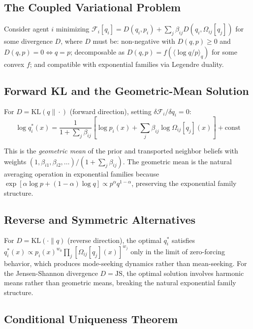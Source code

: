 \documentclass[11pt]{article}
\begin{document}
\subsection*{The Coupled Variational Problem}

Consider agent $i$ minimizing $\mathcal{F}_i[q_i] = D(q_i, p_i) + \sum_j \beta_{ij} D(q_i, \Omega_{ij}[q_j])$ for some divergence $D$, where $D$ must be: non-negative with $D(q, p) \geq 0$ and $D(q, p) = 0 \iff q = p$; decomposable as $D(q, p) = f(\langle \log q/p \rangle_q)$ for some convex $f$; and compatible with exponential families via Legendre duality.

\subsection*{Forward KL and the Geometric-Mean Solution}

For $D = \mathrm{KL}(q \| \cdot)$ (forward direction), setting $\delta \mathcal{F}_i / \delta q_i = 0$:
\begin{equation}
\log q_i^*(x) = \frac{1}{1 + \sum_j \beta_{ij}}\left[\log p_i(x) + \sum_j \beta_{ij} \log \Omega_{ij}[q_j](x)\right] + \text{const}
\end{equation}

This is the \emph{geometric mean} of the prior and transported neighbor beliefs with weights $(1, \beta_{i1}, \beta_{i2}, \ldots)/(1 + \sum_j \beta_{ij})$. The geometric mean is the natural averaging operation in exponential families because $\exp[\alpha \log p + (1-\alpha)\log q] \propto p^\alpha q^{1-\alpha}$, preserving the exponential family structure.

\subsection*{Reverse and Symmetric Alternatives}

For $D = \mathrm{KL}(\cdot \| q)$ (reverse direction), the optimal $q_i^*$ satisfies $q_i^*(x) \propto p_i(x)^{w_0} \prod_j [\Omega_{ij}[q_j](x)]^{w_j}$ only in the limit of zero-forcing behavior, which produces mode-seeking dynamics rather than mean-seeking. For the Jensen-Shannon divergence $D = \mathrm{JS}$, the optimal solution involves harmonic means rather than geometric means, breaking the natural exponential family structure.

\subsection*{Conditional Uniqueness Theorem}
\end{document}
